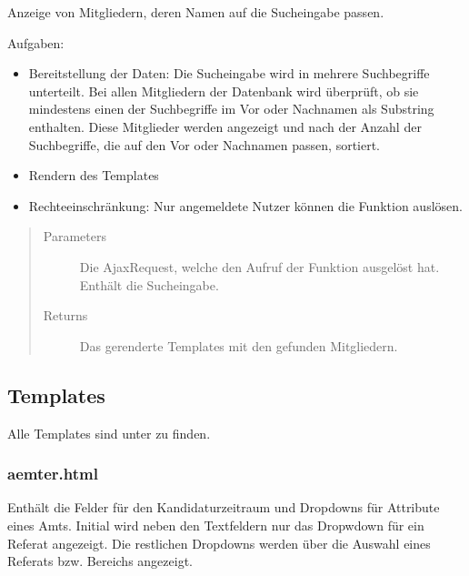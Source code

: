 \documentclass[letterpaper,10pt,english]{sphinxmanual}
\begin{document}
\begin{fulllineitems}
\label{\detokenize{masterCodeDoc:mitglieder.views.suchen}}
Anzeige von Mitgliedern, deren Namen auf die Sucheingabe passen.

Aufgaben:
\begin{itemize}
\item {} 
Bereitstellung der Daten: Die Sucheingabe wird in mehrere Suchbegriffe unterteilt. Bei allen Mitgliedern der Datenbank wird überprüft, ob sie mindestens einen der Suchbegriffe
im Vor\sphinxhyphen{} oder Nachnamen als Substring enthalten. Diese Mitglieder werden angezeigt und nach der Anzahl der Suchbegriffe, die auf den Vor\sphinxhyphen{} oder Nachnamen passen, sortiert.

\item {} 
Rendern des Templates

\item {} 
Rechteeinschränkung: Nur angemeldete Nutzer können die Funktion auslösen.

\end{itemize}
\begin{quote}\begin{description}
\item[{Parameters}] \leavevmode
{} \textendash{} Die Ajax\sphinxhyphen{}Request, welche den Aufruf der Funktion ausgelöst hat. Enthält die Sucheingabe.

\item[{Returns}] \leavevmode
Das gerenderte Templates mit den gefunden Mitgliedern.

\end{description}\end{quote}

\end{fulllineitems}



\subsection{Templates}
\label{\detokenize{masterCodeDoc:id7}}
Alle Templates sind unter  zu finden.


\subsubsection{aemter.html}
\label{\detokenize{masterCodeDoc:aemter-html}}
Enthält die Felder für den Kandidaturzeitraum und Dropdowns für Attribute eines Amts. Initial wird neben den Textfeldern nur das Dropwdown für ein Referat angezeigt. Die restlichen Dropdowns werden über die Auswahl eines Referats bzw. Bereichs angezeigt.
\end{document}

